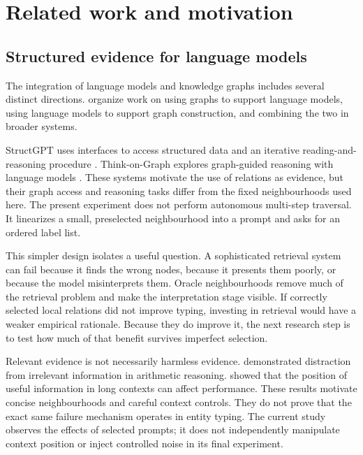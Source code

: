 \chapter{Related work and motivation}

\FloatBarrier

\section{Structured evidence for language models}

The integration of language models and knowledge graphs includes several distinct directions. \citet{pan2024} organize work on using graphs to support language models, using language models to support graph construction, and combining the two in broader systems.


StructGPT uses interfaces to access structured data and an iterative reading-and-reasoning procedure \citep{jiang2023}. Think-on-Graph explores graph-guided reasoning with language models \citep{sun2024}. These systems motivate the use of relations as evidence, but their graph access and reasoning tasks differ from the fixed neighbourhoods used here. The present experiment does not perform autonomous multi-step traversal. It linearizes a small, preselected neighbourhood into a prompt and asks for an ordered label list.


This simpler design isolates a useful question. A sophisticated retrieval system can fail because it finds the wrong nodes, because it presents them poorly, or because the model misinterprets them. Oracle neighbourhoods remove much of the retrieval problem and make the interpretation stage visible. If correctly selected local relations did not improve typing, investing in retrieval would have a weaker empirical rationale. Because they do improve it, the next research step is to test how much of that benefit survives imperfect selection.


Relevant evidence is not necessarily harmless evidence. \citet{shi2023} demonstrated distraction from irrelevant information in arithmetic reasoning. \citet{liu2024} showed that the position of useful information in long contexts can affect performance. These results motivate concise neighbourhoods and careful context controls. They do not prove that the exact same failure mechanism operates in entity typing. The current study observes the effects of selected prompts; it does not independently manipulate context position or inject controlled noise in its final experiment.



